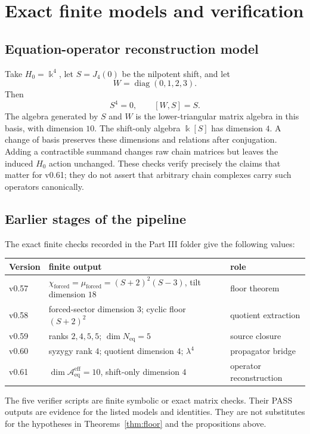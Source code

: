 \documentclass[11pt]{article}
\theoremstyle{definition}
\newcommand{\kk}{\Bbbk}
\newcommand{\Aeff}{\mathscr A_{\mathrm{eq}}^{\mathrm{eff}}}
\newcommand{\Neq}{N_{\mathrm{eq}}}
\newcommand{\forced}{\mathrm{forced}}
\begin{document}
\section{Exact finite models and verification}

\subsection{Equation-operator reconstruction model}

Take \(H_0=\kk^4\), let \(S=J_4(0)\) be the nilpotent shift, and let
\[
W=\operatorname{diag}(0,1,2,3).
\]
Then
\[
S^4=0,
\qquad
[W,S]=S.
\]
The algebra generated by \(S\) and \(W\) is the lower-triangular matrix algebra in this basis,
with dimension \(10\). The shift-only algebra \(\kk[S]\) has dimension \(4\). A change of basis
preserves these dimensions and relations after conjugation. Adding a contractible summand changes
raw chain matrices but leaves the induced \(H_0\) action unchanged. These checks verify precisely
the claims that matter for v0.61; they do not assert that arbitrary chain complexes carry such
operators canonically.

\subsection{Earlier stages of the pipeline}

The exact finite checks recorded in the Part III folder give the following values:
\begin{center}
\begin{tabular}{@{}lll@{}}
\toprule
Version & finite output & role \\
\midrule
v0.57 & \(\chi_{\forced}=\mu_{\forced}=(S+2)^2(S-3)\), tilt dimension \(18\) & floor theorem \\
v0.58 & forced-sector dimension \(3\); cyclic floor \((S+2)^2\) & quotient extraction \\
v0.59 & ranks \(2,4,5,5\); \(\dim\Neq=5\) & source closure \\
v0.60 & syzygy rank \(4\); quotient dimension \(4\); \(\lambda^4\) & propagator bridge \\
v0.61 & \(\dim\Aeff=10\), shift-only dimension \(4\) & operator reconstruction \\
\bottomrule
\end{tabular}
\end{center}

The five verifier scripts are finite symbolic or exact matrix checks. Their PASS outputs are evidence
for the listed models and identities. They are not substitutes for the hypotheses in
Theorems~\ref{thm:floor} and the propositions above.
\end{document}
